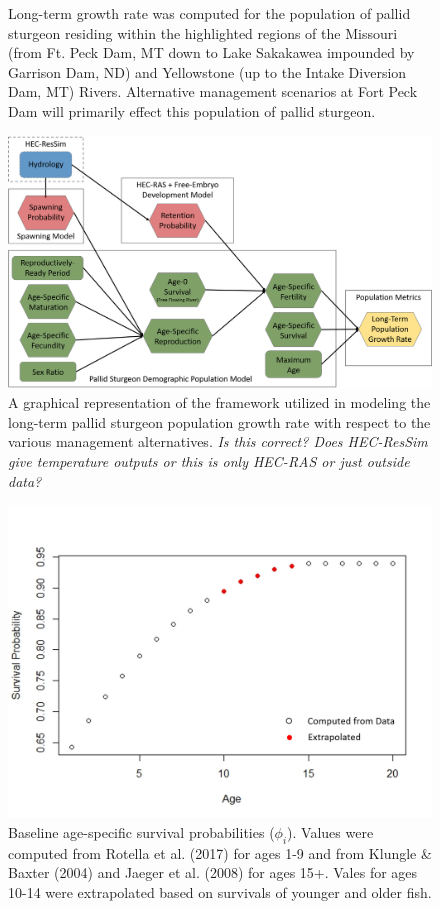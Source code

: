 \documentclass[12pt]{article}
\begin{document}
\newpage

\begin{figure}[h]
\caption{Long-term growth rate was computed for the population of pallid sturgeon residing within the highlighted regions of the Missouri (from Ft. Peck Dam, MT down to Lake Sakakawea impounded by Garrison Dam, ND) and Yellowstone (up to the Intake Diversion Dam, MT) Rivers.  Alternative management scenarios at Fort Peck Dam will primarily effect this population of pallid sturgeon.}
\end{figure}

\newpage

\begin{figure}[h]
\centering
\includegraphics[width=6in]{NEPA_fig_2-model-framework}
\caption{A graphical representation of the framework utilized in modeling the long-term pallid sturgeon population growth rate with respect to the various management alternatives. \textit{Is this correct?  Does HEC-ResSim give temperature outputs or this is only HEC-RAS or just outside data?}}
\end{figure}


\begin{figure}[h]
\centering
\includegraphics[width=6in]{NEPA_fig_3-survivals-w-key}
\caption{Baseline age-specific survival probabilities ($\phi_i$).  Values were computed from Rotella et al. (2017) for ages 1-9 and from Klungle \& Baxter (2004) and Jaeger et al. (2008) for ages 15+.  Vales for ages 10-14 were extrapolated based on survivals of younger and older fish.}
\end{figure}
\end{document}
